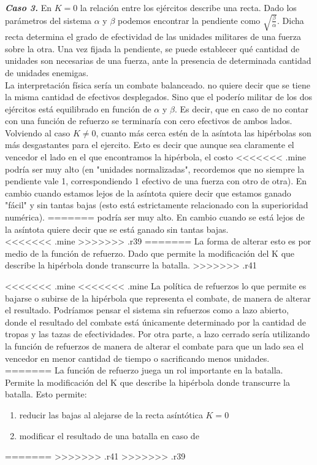 \documentclass{sig-alternate}
\begin{document}
\textbf{\textit{Caso 3.}} 
En $K=0$ la relación entre los ejércitos describe una recta. Dado los parámetros del sistema $\alpha$ y $\beta$ podemos encontrar la pendiente como $\sqrt{\frac{\beta}{\alpha}}$. Dicha recta determina el grado de efectividad de las unidades militares de una fuerza sobre la otra. Una vez fijada la pendiente, se puede 
establecer qué cantidad de unidades son necesarias de una fuerza, ante la presencia de determinada cantidad de unidades enemigas.  \\
La interpretación f\'isica ser\'ia un combate balanceado. no quiere decir que se tiene la misma cantidad de efectivos desplegados. Sino que el poderío militar de los dos ej\'ercitos está equilibrado en función de $\alpha$ y $\beta$. Es decir, que en caso de no contar con una funci\'on de refuerzo se terminar\'ia con cero efectivos de ambos lados. \\
Volviendo al caso $K \ne 0$, cuanto m\'as cerca est\'en de la as\'intota las hip\'erbolas son m\'as desgastantes para el ejercito. Esto es decir que aunque sea claramente
el vencedor el lado en el que encontramos la hip\'erbola, el costo
<<<<<<< .mine
podr\'ia ser muy alto (en "unidades normalizadas", recordemos que no
siempre la pendiente vale 1, correspondiendo 1 efectivo de una fuerza
con otro de otra). En cambio cuando estamos lejos de la as\'intota
quiere decir que estamos ganado "f\'acil" y sin tantas bajas (esto est\'a
estrictamente relacionado con la superioridad num\'erica).
=======
podr\'ia ser muy alto. En cambio cuando se está lejos de la as\'intota
quiere decir que se está ganado sin tantas bajas. \\
<<<<<<< .mine
>>>>>>> .r39
=======
La forma de alterar esto es por medio de la función de refuerzo. Dado que permite la modificación del K que describe la hipérbola donde transcurre la batalla. 
>>>>>>> .r41

<<<<<<< .mine
<<<<<<< .mine
La política de refuerzos lo que permite es bajarse o subirse de la
hip\'erbola que representa el combate, de manera de alterar el
resultado. Podr\'iamos pensar el sistema sin refuerzos como a lazo
abierto, donde el resultado del combate está \'unicamente determinado
por la cantidad de tropas y las tazas de efectividades. Por otra
parte, a lazo cerrado ser\'ia utilizando la funci\'on de refuerzos de
manera de alterar el combate para que un lado sea el vencedor en menor
cantidad de tiempo o sacrificando menos unidades.
=======
La función de refuerzo juega un rol importante en la batalla. Permite la modificación del K que describe la hipérbola donde transcurre la batalla. Esto permite:
\begin{enumerate}
\item reducir las bajas al alejarse de la recta asíntótica $K=0$
\item modificar el resultado de una batalla en caso de
\end{enumerate}
=======
>>>>>>> .r41
>>>>>>> .r39
\end{document}
